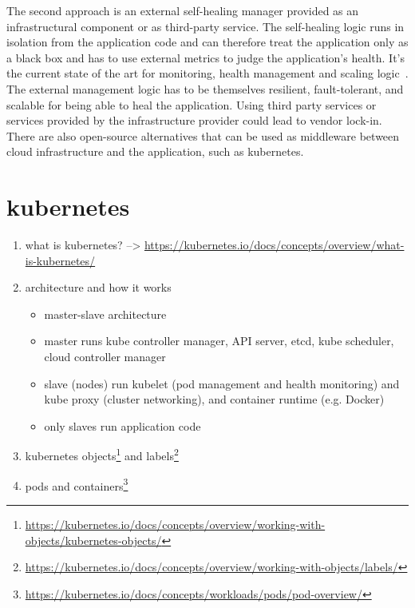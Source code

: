   The second approach is an external self-healing manager provided as an infrastructural component or as third-party service.
  The self-healing logic runs in isolation from the application code and can therefore treat the application only as a black box and has to use external metrics to judge the application's health.
  It's the current state of the art for monitoring, health management and scaling logic~\cite{ToffettiMicroservices}.
  The external management logic has to be themselves resilient, fault-tolerant, and scalable for being able to heal the application.
  Using third party services or services provided by the infrastructure provider could lead to vendor lock-in.
  There are also open-source alternatives that can be used as middleware between cloud infrastructure and the application, such as \gls{kubernetes}.

\section[Kubernetes]{\gls{kubernetes}}
  \begin{enumerate}
    \item what is \gls{kubernetes}? --> \url{https://kubernetes.io/docs/concepts/overview/what-is-kubernetes/}
    \item architecture and how it works
      \begin{itemize}
        \item master-slave architecture
        \item master runs kube controller manager, API server, etcd, kube scheduler, cloud controller manager
        \item slave (nodes) run kubelet (pod management and health monitoring) and kube proxy (cluster networking), and container runtime (e.g. Docker)
        \item only slaves run application code
      \end{itemize}
    \item \gls{kubernetes} objects\footnote{\url{https://kubernetes.io/docs/concepts/overview/working-with-objects/kubernetes-objects/}} and labels\footnote{\url{https://kubernetes.io/docs/concepts/overview/working-with-objects/labels/}}
    \item pods and containers\footnote{\url{https://kubernetes.io/docs/concepts/workloads/pods/pod-overview/}}
  \end{enumerate}
